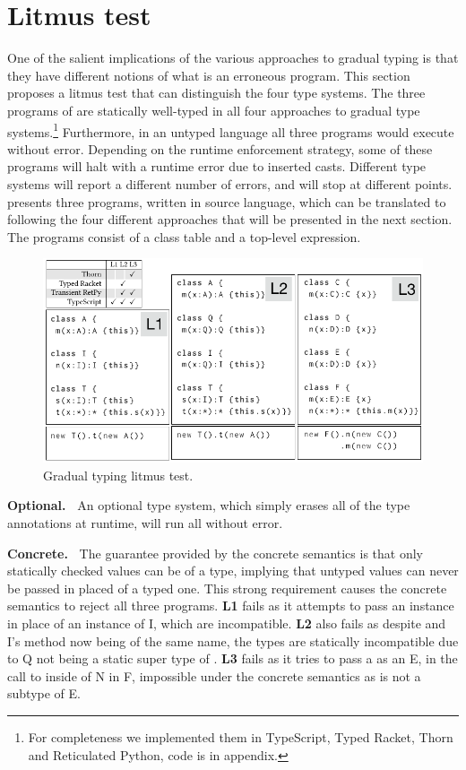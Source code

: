\documentclass[runnningheads]{tex/llncs}
\begin{document}
\section{Litmus test}\label{litmustest}


One of the salient implications of the various approaches to gradual typing
is that they have different notions of what is an erroneous program.  This
section proposes a litmus test that can distinguish the four type
systems. The three programs of  are statically well-typed in
all four approaches to gradual type systems.\footnote{ For completeness we
  implemented them in TypeScript, Typed Racket, Thorn and Reticulated
  Python, code is in appendix.} Furthermore, in an untyped language all
three programs would execute without error. Depending on the runtime
enforcement strategy, some of these programs will halt with a runtime error
due to inserted casts. Different type systems will report a different number
of errors, and will stop at different points.   presents
three programs, written in source language, which can be translated to
\kafka following the four different approaches that will be presented in the
next section. The programs consist of a class table and a top-level
expression.

\begin{figure}[!h]
	\includegraphics[width=.95\columnwidth]{../figures/litm}
	\caption{Gradual typing litmus test.}\label{litmus}
\end{figure}

{\bf Optional.~} An optional type system, which simply erases all of the
type annotations at runtime, will run all without error.

{\bf Concrete.~} The guarantee provided by the concrete semantics is that
only statically checked values can be of a type, implying that untyped
values can never be passed in placed of a typed one. This strong requirement
causes the concrete semantics to reject all three programs. {\bf L1} fails
as it attempts to pass an \A instance in place of an instance of \xt I,
which are incompatible.  {\bf L2} also fails as despite \A and \xt I's
method now being of the same name, the types are statically incompatible due
to \xt Q not being a static super type of \A. {\bf L3} fails as it tries to
pass a \C as an \xt E, in the call to \m inside of \xt N in \xt F,
impossible under the concrete semantics as \C is not a subtype of \xt E.
\end{document}
